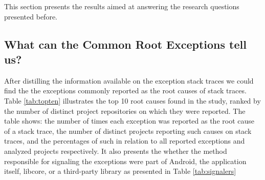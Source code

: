\documentclass[conference]{IEEEtran}
\begin{document}
This section presents the results aimed at answering the research 
questions presented before.

\subsection{What can the Common Root Exceptions tell us? }

After distilling the information available on the exception stack traces we could find 
the the exceptions commonly reported as the root causes of stack traces.
Table \ref{tab:topten} illustrates the top 10 root causes found in the study,
 ranked by the number of distinct project repositories on which they were reported. 
The table shows: the number of times each exception was reported as 
the root cause of a stack trace, the number of distinct projects reporting such causes on stack traces, 
and the percentages of such in relation to all reported exceptions and analyzed projects respectively.
It also presents the whether the method responsible for signaling the exceptions were
part of Android, the application itself, libcore, or a third-party library as presented in Table  \ref{tab:signalers} 






\end{document}
